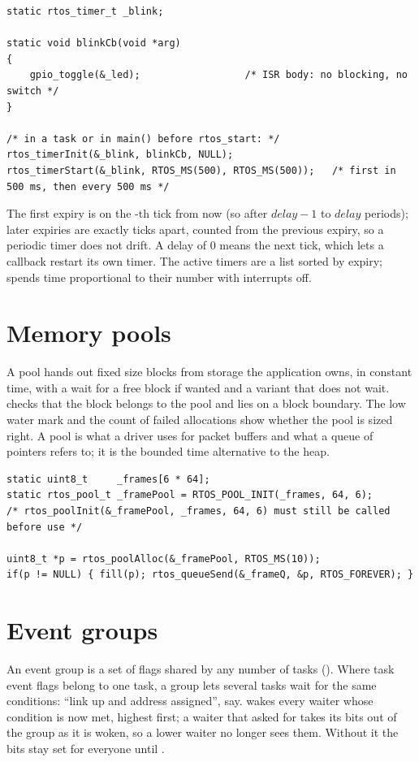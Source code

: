 \begin{lstlisting}
static rtos_timer_t _blink;

static void blinkCb(void *arg)
{
    gpio_toggle(&_led);                  /* ISR body: no blocking, no switch */
}

/* in a task or in main() before rtos_start: */
rtos_timerInit(&_blink, blinkCb, NULL);
rtos_timerStart(&_blink, RTOS_MS(500), RTOS_MS(500));   /* first in 500 ms, then every 500 ms */
\end{lstlisting}

The first expiry is on the -th tick from now (so after $\mathit{delay}-1$ to
$\mathit{delay}$ periods); later expiries are exactly  ticks apart, counted
from the previous expiry, so a periodic timer does not drift. A delay of 0 means the next
tick, which lets a callback restart its own timer. The active timers are a list sorted
by expiry;  spends time proportional to their number with
interrupts off.

\section{Memory pools}

A pool hands out fixed size blocks from storage the application owns, in constant time,
with a wait for a free block if wanted and a  variant that does not wait.
 checks that the block belongs to the pool and lies on a block
boundary. The low water mark  and the count of failed allocations
 show whether the pool is sized right. A pool is what a driver uses for
packet buffers and what a queue of pointers refers to; it is the bounded time
alternative to the heap.

\begin{lstlisting}
static uint8_t     _frames[6 * 64];
static rtos_pool_t _framePool = RTOS_POOL_INIT(_frames, 64, 6);
/* rtos_poolInit(&_framePool, _frames, 64, 6) must still be called before use */

uint8_t *p = rtos_poolAlloc(&_framePool, RTOS_MS(10));
if(p != NULL) { fill(p); rtos_queueSend(&_frameQ, &p, RTOS_FOREVER); }
\end{lstlisting}

\section{Event groups}

An event group is a set of flags shared by any number of tasks
(). Where task event flags belong to one task, a group lets
several tasks wait for the same conditions: ``link up and address assigned'', say.
 wakes every waiter whose condition is now met, highest first; a
waiter that asked for  takes its bits out of the group as it is
woken, so a lower waiter no longer sees them. Without it the bits stay set for everyone
until .

